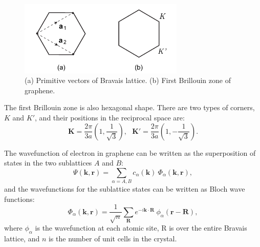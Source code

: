\documentclass[pdflatex, sectionletters, 12pt]{pittetd}    %
\begin{document}
\begin{figure}[h!]
	\centering
	\includegraphics[width=0.7\textwidth]{Drawing/Bravais.pdf}
	\caption{(a) Primitive vectors of Bravais lattice. (b) First Brillouin zone of graphene.}
	\label{FIG:Bravais}
\end{figure}

The first Brillouin zone is also hexagonal shape. There are two types of corners, $K$ and $K'$, and their positions in the reciprocal space are:
$$\mathbf{K} = \frac{2\pi}{3a}\left(1, \frac{1}{\sqrt{3}}\right), \ \ \ \mathbf{K'} =  \frac{2\pi}{3a}\left(1, -\frac{1}{\sqrt{3}}\right).$$

The wavefunction of electron in graphene can be written as the superposition of states in the two sublattices $A$ and $B$:
$$\Psi(\mathbf{k}, \mathbf{r}) = \sum_{\alpha = A, B}c_{\alpha}(\mathbf{k}) \ \Phi_{\alpha}(\mathbf{k}, \mathbf{r}),$$
and the wavefunctions for the sublattice states can be written as Bloch wave functions:
$$\Phi_{\alpha}(\mathbf{k}, \mathbf{r}) = \frac{1}{\sqrt{n}}\sum_\mathbf{R} e^{-i \mathbf{k} \cdot \mathbf{R}} \ \phi_{\alpha}(\mathbf{r} - \mathbf{R}),$$
where $\phi_{\alpha}$ is the wavefunction at each atomic site, R is over the entire Bravais lattice, and $n$ is the number of unit cells in the crystal. 
\end{document}

